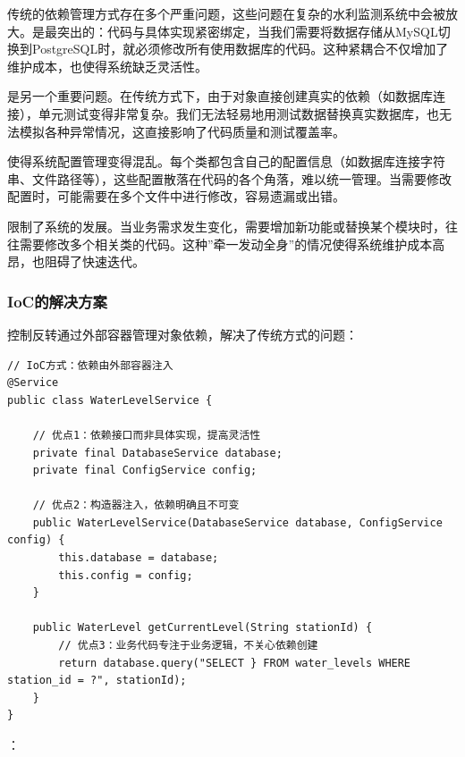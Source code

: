 传统的依赖管理方式存在多个严重问题，这些问题在复杂的水利监测系统中会被放大。是最突出的：代码与具体实现紧密绑定，当我们需要将数据存储从MySQL切换到PostgreSQL时，就必须修改所有使用数据库的代码。这种紧耦合不仅增加了维护成本，也使得系统缺乏灵活性。

是另一个重要问题。在传统方式下，由于对象直接创建真实的依赖（如数据库连接），单元测试变得非常复杂。我们无法轻易地用测试数据替换真实数据库，也无法模拟各种异常情况，这直接影响了代码质量和测试覆盖率。

使得系统配置管理变得混乱。每个类都包含自己的配置信息（如数据库连接字符串、文件路径等），这些配置散落在代码的各个角落，难以统一管理。当需要修改配置时，可能需要在多个文件中进行修改，容易遗漏或出错。

限制了系统的发展。当业务需求发生变化，需要增加新功能或替换某个模块时，往往需要修改多个相关类的代码。这种''牵一发动全身''的情况使得系统维护成本高昂，也阻碍了快速迭代。

\hypertarget{iocux7684ux89e3ux51b3ux65b9ux6848}{%
\subsubsection{IoC的解决方案}\label{iocux7684ux89e3ux51b3ux65b9ux6848}}

控制反转通过外部容器管理对象依赖，解决了传统方式的问题：

\begin{lstlisting}[style=java]
// IoC方式：依赖由外部容器注入
@Service
public class WaterLevelService {
    
    // 优点1：依赖接口而非具体实现，提高灵活性
    private final DatabaseService database;
    private final ConfigService config;
    
    // 优点2：构造器注入，依赖明确且不可变
    public WaterLevelService(DatabaseService database, ConfigService config) {
        this.database = database;
        this.config = config;
    }
    
    public WaterLevel getCurrentLevel(String stationId) {
        // 优点3：业务代码专注于业务逻辑，不关心依赖创建
        return database.query("SELECT } FROM water_levels WHERE station_id = ?", stationId);
    }
}
\end{lstlisting}

：


